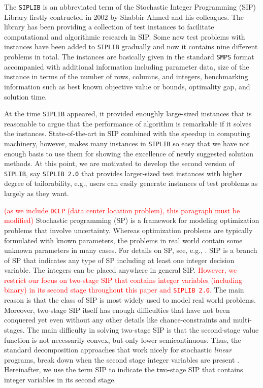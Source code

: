 The \texttt{SIPLIB} \cite{web:SIPLIB1} is an abbreviated term of the Stochastic Integer Programming (SIP) Library firstly contructed in 2002 by Shabbir Ahmed and his colleagues. The library has been providing a collection of test instances to facilitate computational and algorithmic research in SIP. Some new test problems with instances have been added to \texttt{SIPLIB} gradually and now it contains nine different problems in total.  The instances are basically given in the standard \texttt{SMPS} format accompanied with additional information including parameter data, size of the instance in terms of the number of rows, columns, and integers, benchmarking information such as best known objective value or bounds, optimality gap, and solution time.

At the time \texttt{SIPLIB} appeared, it provided enoughly large-sized instances that is reasonable to argue that the performance of algorithm is remarkable if it solves the instances. State-of-the-art in SIP combined with the speedup in computing machinery, however, makes many instances in \texttt{SIPLIB} so easy that we have not enough basis to use them for showing the excellence of newly suggested solution methods. At this point, we are motivated to develop the second version of \texttt{SIPLIB}, say \texttt{SIPLIB 2.0} that provides larger-sized test instances with higher degree of tailorability, e.g., users can easily generate instances of test problems as largely as they want.%

\textcolor{red}{(as we include \texttt{DCLP} (data center location problem), this paragraph must be modified)} Stochastic programming (SP) is a framework for modeling optimization problems that involve uncertainty. Whereas optimization problems are typically formulated with known parameters, the problems in real world contain some unknown parameters in many cases. For details on SP, see, e.g., \cite{web:SPS,book:BL2011}. SIP is a branch of SP that indicates any type of SP including at least one integer decision variable. The integers can be placed anywhere in general SIP. \textcolor{red}{However, we restrict our focus on two-stage SIP that contains integer variables (including binary) in its second stage throughout this paper and \texttt{SIPLIB 2.0}.} The main reason is that the class of SIP is most widely used to model real world problems. Moreover, two-stage SIP itself has enough difficulties that have not been conquered yet even without any other details like chance-constraints and multi-stages. The main difficulty in solving two-stage SIP is that the second-stage value function is not necessarily convex, but only lower semicontinuous. Thus, the standard decomposition approaches that work nicely for stochastic \textit{linear} programs, break down when the second stage integer variables are present \cite{journal:AG2004}. Hereinafter, we use the term SIP to indicate the two-stage SIP that contains integer variables in its second stage.

